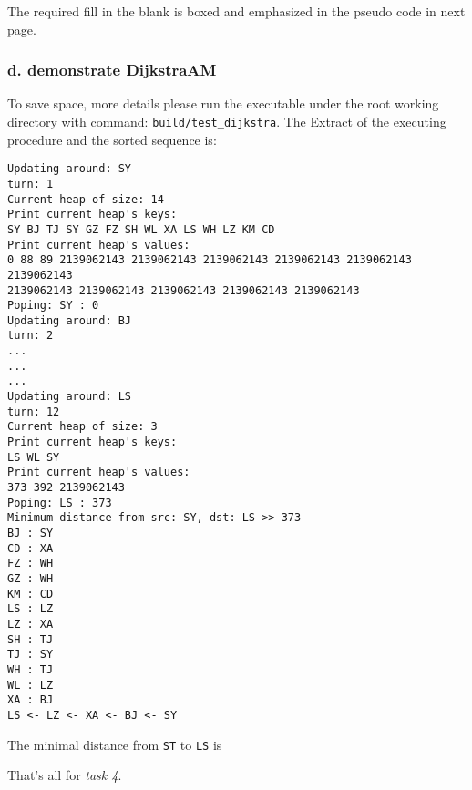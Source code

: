 The required fill in the blank is boxed and emphasized in the pseudo code in next page.

\subsubsection*{d. demonstrate \textbf{DijkstraAM}}
To save space, more details please run the executable under the root working directory with
command: \verb|build/test_dijkstra|. The Extract of the executing procedure and the sorted sequence is: 
\begin{verbatim}
Updating around: SY
turn: 1
Current heap of size: 14
Print current heap's keys:
SY BJ TJ SY GZ FZ SH WL XA LS WH LZ KM CD 
Print current heap's values:
0 88 89 2139062143 2139062143 2139062143 2139062143 2139062143 2139062143 
2139062143 2139062143 2139062143 2139062143 2139062143 
Poping: SY : 0
Updating around: BJ
turn: 2
...
...
...
Updating around: LS
turn: 12
Current heap of size: 3
Print current heap's keys:
LS WL SY 
Print current heap's values:
373 392 2139062143 
Poping: LS : 373
Minimum distance from src: SY, dst: LS >> 373
BJ : SY
CD : XA
FZ : WH
GZ : WH
KM : CD
LS : LZ
LZ : XA
SH : TJ
TJ : SY
WH : TJ
WL : LZ
XA : BJ
LS <- LZ <- XA <- BJ <- SY
\end{verbatim}

The minimal distance from \verb|ST| to \verb|LS| is 

That's all for \textit{task 4}.